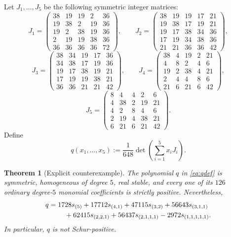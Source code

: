 \documentclass[11pt]{article}
\newtheorem{theorem}{Theorem}[section]
\theoremstyle{remark}
\begin{document}
Let $J_1,\dots,J_5$ be the following symmetric integer matrices:
\begingroup
\scriptsize
\[
J_1=
\begin{pmatrix}
38&19&19&2&36\\
19&38&2&19&36\\
19&2&38&19&36\\
2&19&19&38&36\\
36&36&36&36&72
\end{pmatrix},\qquad
J_2=
\begin{pmatrix}
38&19&19&17&21\\
19&38&17&19&21\\
19&17&38&34&36\\
17&19&34&38&36\\
21&21&36&36&42
\end{pmatrix},
\]
\[
J_3=
\begin{pmatrix}
38&34&19&17&36\\
34&38&17&19&36\\
19&17&38&19&21\\
17&19&19&38&21\\
36&36&21&21&42
\end{pmatrix},\qquad
J_4=
\begin{pmatrix}
38&4&19&2&21\\
4&8&2&4&6\\
19&2&38&4&21\\
2&4&4&8&6\\
21&6&21&6&42
\end{pmatrix},
\]
\[
J_5=
\begin{pmatrix}
8&4&4&2&6\\
4&38&2&19&21\\
4&2&8&4&6\\
2&19&4&38&21\\
6&21&6&21&42
\end{pmatrix}.
\]
\endgroup
Define
\begin{equation}
  q(x_1,\dots,x_5)
  :=\frac1{648}\det\!\left(\sum_{i=1}^5x_iJ_i\right).
  \label{eq:qdef}
\end{equation}

\begin{theorem}[Explicit counterexample]
\label{thm:explicit}
The polynomial $q$ in \eqref{eq:qdef} is symmetric, homogeneous of degree $5$,
real stable, and every one of its $126$ ordinary degree-$5$ monomial
coefficients is strictly positive.  Nevertheless,
\begin{align}
q={}&1728s_{(5)}+17712s_{(4,1)}+47115s_{(3,2)}
      +56643s_{(3,1,1)} \notag\\
   &\quad +62415s_{(2,2,1)}+56437s_{(2,1,1,1)}
      -2972s_{(1,1,1,1,1)}.
\label{eq:schurexpansion}
\end{align}
In particular, $q$ is not Schur-positive.
\end{theorem}
\end{document}
